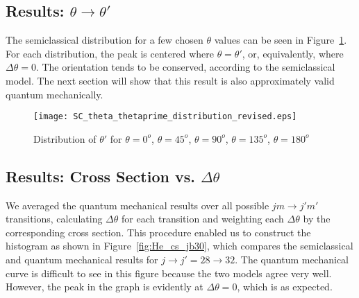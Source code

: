 \documentclass[letterpaper,11pt]{article}
\begin{document}
\subsection{Results: $\theta\rightarrow \theta'$}
The semiclassical distribution for a few chosen $\theta$ values can be seen in
Figure~\ref{fig:SC_t_tp}. For each distribution, the peak is centered where $\theta=\theta'$,
or, equivalently, where $\Delta\theta=0$.  The orientation tends to be
conserved, according to the semiclassical model.  The next section will show
that this result is also approximately valid quantum mechanically.
\begin{figure}[ht!]
    \centering
    \texttt{[image: SC\_theta\_thetaprime\_distribution\_revised.eps]}
    \caption{Distribution of $\theta'$ for $\theta=0^o$, $\theta=45^o$, $\theta=90^o$, $\theta=135^o$, $\theta=180^o$}
\label{fig:SC_t_tp}
\end{figure}

\subsection{Results: Cross Section vs. $\Delta\theta$} 
We averaged the quantum mechanical results over all possible $jm\rightarrow
j'm'$ transitions, calculating $\Delta\theta$ for each transition and weighting
each $\Delta\theta$ by the corresponding cross section.  This procedure enabled
us to construct the histogram as shown in Figure~\ref{fig:He_cs_jb30}, which
compares the semiclassical and quantum mechanical results for $j\rightarrow j'=28\rightarrow 32$.  The quantum mechanical
curve is difficult to see in this figure because the two models agree very
well.  However, the peak in the graph is evidently at $\Delta\theta=0$, which
is as expected.
\end{document}
